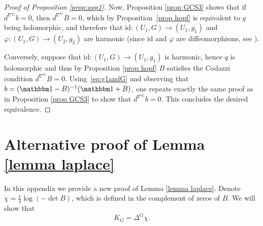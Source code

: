 \begin{proof}[Proof of Proposition \ref{prop:app1}]
Now, Proposition \ref{prop GCS3} shows that if $d^{\nabla^{g_1}}\!b=0$, then $d^{\nabla^{G}}\!B=0$, which by Proposition~\ref{prop hopf} is equivalent to $q$ being holomorphic, and therefore that \hbox{$\mathrm{id}:(U_1,G)\!\to\! (U_1,g_1)$} and $\varphi:(U_1,G)\to (U_2,g_2)$ are harmonic (since $\mathrm{id}$ and $\varphi$ are diffeomorphisms, see \cite[\S 9]{zbMATH03608406}).

Conversely, suppose that $\mathrm{id}:(U_1,G)\to (U_1,g_1)$ is harmonic, hence $q$ is holomorphic and thus by Proposition \ref{prop hopf} $B$ satisfies the Codazzi condition $d^{\nabla^{G}}\!B=0$. Using~\eqref{eq:g1andG} and observing that $b=(\mathbbm 1-B)^{-1}(\mathbbm 1+B)$, one repeats exactly the same proof as in Proposition \ref{prop GCS3} to show that $d^{\nabla^{g_1}}\!b=0$. This concludes the desired equivalence.
\end{proof}

\section{Alternative proof of Lemma \ref{lemma laplace}}
\label{app:alternative}

In this appendix we provide a new proof of Lemma \ref{lemma laplace}. Denote $\chi=\tfrac14\log(-\det B)$, which is defined in the complement of zeros of $B$. We will show that
\begin{equation}\label{eq:curvature laplacian}
K_G=\Delta^G\chi.
\end{equation}

